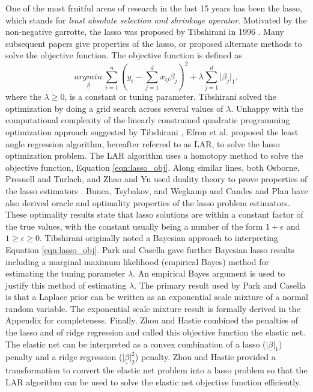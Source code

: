 One of the most fruitful areas of research in the last 15 years has been the lasso, which stands for \emph{least absolute selection and shrinkage operator}. Motivated by the non-negative garrotte, the lasso was proposed by Tibshirani in 1996 \cite{tibshirani1996regression}. Many subsequent papers give properties of the lasso, or proposed alternate methods to solve the objective function. The objective function is defined as
\begin{equation}\label{eqn:lasso_obj}
\underset{\underline{\beta}}{argmin}\ \sum_{i=1}^n(y_i - \sum_{j=1}^dx_{ij}\beta_j)^2 +\lambda\sum_{j=1}^d\vert \beta_j\vert_1,
\end{equation}
 where the $\lambda \geq 0$, is a constant or tuning parameter. Tibshirani solved the optimization by doing a grid search across several values of $\lambda$. Unhappy with the computational complexity of the linearly constrained quadratic programming optimization approach suggested by Tibshirani \cite{tibshirani1996regression}, Efron et al. \cite{efron2004least} proposed the least angle regression algorithm, hereafter referred to as LAR, to solve the lasso optimization problem. The LAR algorithm uses a homotopy method to solve the objective function, Equation \ref{eqn:lasso_obj}. Along similar lines, both Osborne, Presnell and Turlach, and Zhao and Yu used duality theory to prove properties of the lasso estimators \cite{osborne2000lasso,zhao2007model}. Bunea, Tsybakov, and Wegkamp  \cite{bunea2007sparsity} and Candes and Plan  \cite{candes2011tight} have also derived oracle and optimality properties of the lasso problem estimators. These optimality results state that lasso solutions are within a constant factor of the true values, with the constant usually being a number of the form $1+\epsilon$ and $1\geq\epsilon\geq 0$. Tibshirani \cite{tibshirani1996regression} originally noted a Bayesian approach to interpreting Equation \ref{eqn:lasso_obj}. Park and Casella  \cite{park2008bayesian} gave further Bayesian lasso results including a marginal maximum likelihood (empirical Bayes) method for estimating the tuning parameter $\lambda$. An empirical Bayes argument is used to justify this method of estimating $\lambda$. The primary result used by Park and Casella is that a Laplace prior can be written as an exponential scale mixture of a normal random variable. The exponential scale mixture result is formally derived in the Appendix for completeness.  Finally, Zhou and Hastie \cite{zou2005regularization} combined the penalties of the lasso and of ridge regression and called this objective function the elastic net. The elastic net can be interpreted as a convex combination of a lasso ($\vert \underline{\beta}\vert_1$) penalty and a ridge regression ($\vert \underline{\beta}\vert_2^2$) penalty. Zhou and Hastie \cite{zou2005regularization} provided a transformation to convert the elastic net problem into a lasso problem so that the LAR algorithm can be used to solve the elastic net objective function efficiently.      
 
